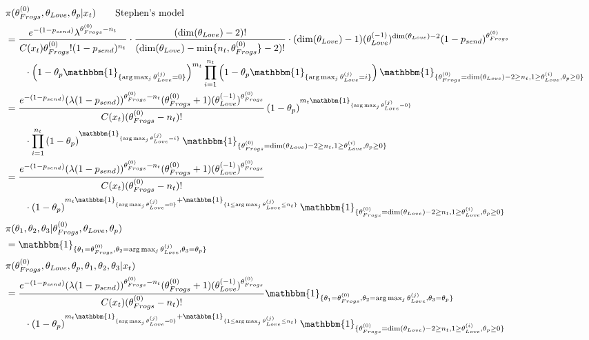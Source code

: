 \documentclass[10pt, a4paper]{article}
\begin{document}
    \begin{align*}
        &\pi(\theta_{Frogs}^{(0)}, \theta_{Love}, \theta_p|x_t) \qquad \text{Stephen's model} \\
        &= \frac{e^{-(1-p_{send})}\lambda^{\theta_{Frogs}^{(0)}-n_t}}{C(x_t)\theta_{Frogs}^{(0)}!(1-p_{send})^{n_t}}\cdot\frac{(\dim(\theta_{Love})-2)!}{(\dim(\theta_{Love})-\min\{n_t,\theta_{Frogs}^{(0)}\}-2)!} \cdot (\dim(\theta_{Love})-1)(\theta_{Love}^{(-1)})^{\dim(\theta_{Love})-2}(1-p_{send})^{\theta_{Frogs}^{(0)}}\\&\qquad\cdot \left(1-\theta_p\mathbbm{1}_{\{\arg\max_j \theta_{Love}^{(j)}=0\}}\right)^{m_t}\prod_{i=1}^{n_t} \left(1-\theta_p\mathbbm{1}_{\{\arg\max_j \theta_{Love}^{(j)}=i\}}\right)\mathbbm{1}_{\{\theta_{Frogs}^{(0)} = \dim(\theta_{Love})-2 \geq n_t, 1 \geq \theta_{Love}^{(i)}, \theta_p\geq 0\}} \\
        &= \frac{e^{-(1-p_{send})}(\lambda(1-p_{send}))^{\theta_{Frogs}^{(0)}-n_t}(\theta_{Frogs}^{(0)}+1)(\theta_{Love}^{(-1)})^{\theta_{Frogs}^{(0)}}}{C(x_t)(\theta_{Frogs}^{(0)}-n_t)!}\left(1-\theta_p\right)^{m_t\mathbbm{1}_{\{\arg\max_j \theta_{Love}^{(j)}=0\}}}\\&\qquad\cdot\prod_{i=1}^{n_t} \left(1-\theta_p\right)^{\mathbbm{1}_{\{\arg\max_j \theta_{Love}^{(j)}=i\}}}\mathbbm{1}_{\{\theta_{Frogs}^{(0)} = \dim(\theta_{Love})-2 \geq n_t, 1 \geq \theta_{Love}^{(i)}, \theta_p\geq 0\}} \\
        &= \frac{e^{-(1-p_{send})}(\lambda(1-p_{send}))^{\theta_{Frogs}^{(0)}-n_t}(\theta_{Frogs}^{(0)}+1)(\theta_{Love}^{(-1)})^{\theta_{Frogs}^{(0)}}}{C(x_t)(\theta_{Frogs}^{(0)}-n_t)!}\\&\qquad\cdot\left(1-\theta_p\right)^{m_t\mathbbm{1}_{\{\arg\max_j \theta_{Love}^{(j)}=0\}}+\mathbbm{1}_{\{1 \leq \arg\max_j \theta_{Love}^{(j)} \leq n_t\}}}\mathbbm{1}_{\{\theta_{Frogs}^{(0)} = \dim(\theta_{Love})-2 \geq n_t, 1 \geq \theta_{Love}^{(i)},\theta_p\geq 0\}} \\ 
        &\pi(\theta_1, \theta_2, \theta_3|\theta_{Frogs}^{(0)}, \theta_{Love}, \theta_p) \\
        &= \mathbbm{1}_{\{\theta_1=\theta_{Frogs}^{(0)}, \theta_2=\arg\max_j\theta_{Love}^{(j)}, \theta_3=\theta_p\}} \\
        &\pi(\theta_{Frogs}^{(0)}, \theta_{Love}, \theta_p, \theta_1, \theta_2, \theta_3|x_t) \\
        &=\frac{e^{-(1-p_{send})}(\lambda(1-p_{send}))^{\theta_{Frogs}^{(0)}-n_t}(\theta_{Frogs}^{(0)}+1)(\theta_{Love}^{(-1)})^{\theta_{Frogs}^{(0)}}}{C(x_t)(\theta_{Frogs}^{(0)}-n_t)!}\mathbbm{1}_{\{\theta_1=\theta_{Frogs}^{(0)}, \theta_2=\arg\max_j\theta_{Love}^{(j)}, \theta_3=\theta_p\}}\\&\qquad\cdot\left(1-\theta_p\right)^{m_t\mathbbm{1}_{\{\arg\max_j \theta_{Love}^{(j)}=0\}}+\mathbbm{1}_{\{1 \leq \arg\max_j \theta_{Love}^{(j)} \leq n_t\}}}\mathbbm{1}_{\{\theta_{Frogs}^{(0)} = \dim(\theta_{Love})-2 \geq n_t, 1 \geq \theta_{Love}^{(i)},\theta_p\geq 0\}} \\ 

\end{align*}
\end{document}
